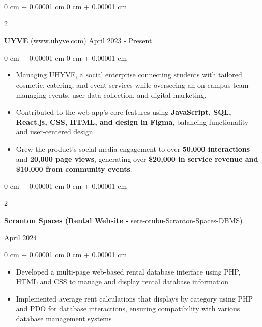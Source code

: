 \documentclass[10pt, letterpaper]{article}
\newenvironment{highlights}{
    \begin{itemize}[
        topsep=0.10 cm,
        parsep=0.10 cm,
        partopsep=0pt,
        itemsep=0pt,
        leftmargin=0 cm + 10pt
    ]
}{
    \end{itemize}
} %
\newenvironment{onecolentry}{
    \begin{adjustwidth}{
        0 cm + 0.00001 cm
    }{
        0 cm + 0.00001 cm
    }
}{
    \end{adjustwidth}
} %
\newenvironment{twocolentry}[2][]{
    \onecolentry
    \def\secondColumn{#2}
    \setcolumnwidth{\fill, 4.5 cm}
    \begin{paracol}{2}
}{
    \switchcolumn \raggedleft \secondColumn
    \end{paracol}
    \endonecolentry
} %
\begin{document}

        \begin{twocolentry}{
            April 2023 - Present
        }
            \textbf{UYVE} (\href{https://https://www.uhyve.com/}{www.uhyve.com})\end{twocolentry}

        \vspace{0.10 cm}
        \begin{onecolentry}
            \begin{highlights}
                \item Managing UHYVE, a social enterprise connecting students with tailored cosmetic, catering, and event services while overseeing an on-campus team managing events, user data collection, and digital marketing. 
                \item Contributed to the web app’s core features using \textbf{JavaScript, SQL, React.js, CSS, HTML, and design in Figma}, balancing functionality and user-centered design. 
                \item Grew the product's social media engagement to over \textbf{50,000 interactions} and \textbf{20,000 page views}, generating over \textbf{\$20,000 in service revenue and \$10,000 from community events}.
            \end{highlights}
        \end{onecolentry}

        \vspace{0.2 cm}

        \begin{twocolentry}{
            April 2024
        }
            \textbf{Scranton Spaces (Rental Website - }\href{https://github.com/sere-otubu/Scranton-Spaces-DBMS}{sere-otubu-Scranton-Spaces-DBMS})
            \end{twocolentry}

        \vspace{0.10 cm}
        \begin{onecolentry}
            \begin{highlights}
                \item Developed a multi-page web-based rental database interface using PHP, HTML and CSS to manage and display rental database information
                \item Implemented average rent calculations that displays by category using PHP and PDO for database interactions, ensuring compatibility with various database management systems
            \end{highlights}
        \end{onecolentry}
\end{document}
